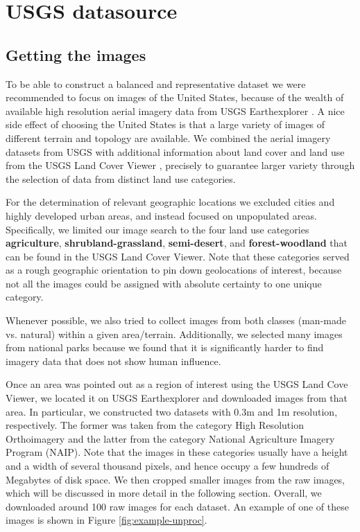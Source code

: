 \section{USGS datasource}

\subsection{Getting the images}\label{usgs_data}

To be able to construct a balanced and representative dataset we were recommended to focus on images of the United States, because of the wealth of available high resolution aerial imagery data from USGS Earthexplorer \parencite{usgs}. A nice side effect of choosing the United States is that a large variety of images of different terrain and topology are available. We combined the aerial imagery datasets from USGS with additional information about land cover and land use from the USGS Land Cover Viewer \parencite{land_cover_viewer}, precisely to guarantee larger variety through the selection of data from distinct land use categories.

For the determination of relevant geographic locations we excluded cities and highly developed urban areas, and instead focused on unpopulated areas. Specifically, we limited our image search to the four land use categories \textbf{agriculture}, \textbf{shrubland-grassland}, \textbf{semi-desert}, and \textbf{forest-woodland} that can be found in the USGS Land Cover Viewer. Note that these categories served as a rough geographic orientation to pin down geolocations of interest, because not all the images could be assigned with absolute certainty to one unique category. 

Whenever possible, we also tried to collect images from both classes (man-made vs. natural) within a given area/terrain. Additionally, we selected many images from national parks because we found that it is significantly harder to find imagery data that does not show human influence.

Once an area was pointed out as a region of interest using the USGS Land Cove Viewer, we located it on USGS Earthexplorer and downloaded images from that area. In particular, we constructed two datasets with 0.3m and 1m resolution, respectively. The former was taken from the category High Resolution Orthoimagery and the latter from the category National Agriculture Imagery Program (NAIP). Note that the images in these categories usually have a height and a width of several thousand pixels, and hence occupy a few hundreds of Megabytes of disk space. We then cropped smaller images from the raw images, which will be discussed in more detail in the following section. Overall, we downloaded around 100 raw images for each dataset. An example of one of these images is shown in Figure \ref{fig:example-unproc}.

